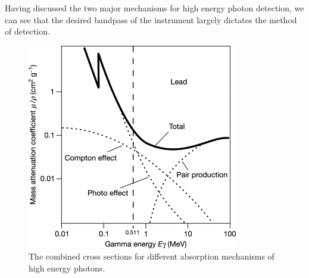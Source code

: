 Having discussed the two major mechanisms for high energy photon detection, we can see that the desired bandpass of the instrument largely dictates the method of detection.

\begin{figure}[h!]
    \centering
    \includegraphics[width=0.75\linewidth]{Pictures//figures/gamma_cross_section.png}
    \caption{The combined cross sections for different absorption mechanisms of high energy photons.}
    \label{fig:high_energy_absorption_cross_section}
\end{figure}